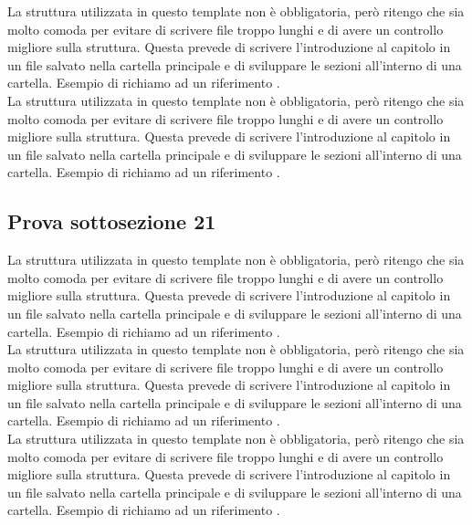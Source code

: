 \noindent
La struttura utilizzata in questo template non è obbligatoria, però ritengo che sia molto comoda per evitare di scrivere file troppo lunghi e di avere un controllo migliore sulla struttura. Questa prevede di scrivere l'introduzione al capitolo in un file salvato nella cartella principale e di sviluppare le sezioni all'interno di una cartella. Esempio di richiamo ad un riferimento \cite{Latex-impara-latex}.\\

\noindent
La struttura utilizzata in questo template non è obbligatoria, però ritengo che sia molto comoda per evitare di scrivere file troppo lunghi e di avere un controllo migliore sulla struttura. Questa prevede di scrivere l'introduzione al capitolo in un file salvato nella cartella principale e di sviluppare le sezioni all'interno di una cartella. Esempio di richiamo ad un riferimento \cite{Latex-impara-latex}.\\

\subsection{Prova sottosezione 21}
\noindent
La struttura utilizzata in questo template non è obbligatoria, però ritengo che sia molto comoda per evitare di scrivere file troppo lunghi e di avere un controllo migliore sulla struttura. Questa prevede di scrivere l'introduzione al capitolo in un file salvato nella cartella principale e di sviluppare le sezioni all'interno di una cartella. Esempio di richiamo ad un riferimento \cite{Latex-impara-latex}.\\

\noindent
La struttura utilizzata in questo template non è obbligatoria, però ritengo che sia molto comoda per evitare di scrivere file troppo lunghi e di avere un controllo migliore sulla struttura. Questa prevede di scrivere l'introduzione al capitolo in un file salvato nella cartella principale e di sviluppare le sezioni all'interno di una cartella. Esempio di richiamo ad un riferimento \cite{Latex-impara-latex}.\\

\noindent
La struttura utilizzata in questo template non è obbligatoria, però ritengo che sia molto comoda per evitare di scrivere file troppo lunghi e di avere un controllo migliore sulla struttura. Questa prevede di scrivere l'introduzione al capitolo in un file salvato nella cartella principale e di sviluppare le sezioni all'interno di una cartella. Esempio di richiamo ad un riferimento \cite{Latex-impara-latex}.\\

